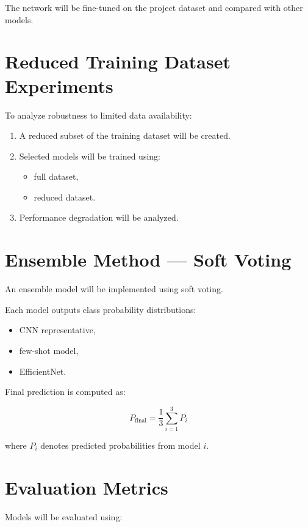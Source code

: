 \documentclass[11pt,a4paper]{article}
\begin{document}
The network will be fine-tuned on the project dataset and compared with other models.

\section{Reduced Training Dataset Experiments}

To analyze robustness to limited data availability:

\begin{enumerate}
    \item A reduced subset of the training dataset will be created.
    \item Selected models will be trained using:
    \begin{itemize}
        \item full dataset,
        \item reduced dataset.
    \end{itemize}
    \item Performance degradation will be analyzed.
\end{enumerate}

\section{Ensemble Method --- Soft Voting}

An ensemble model will be implemented using soft voting.

Each model outputs class probability distributions:

\begin{itemize}
    \item CNN representative,
    \item few-shot model,
    \item EfficientNet.
\end{itemize}

Final prediction is computed as:

\begin{equation}
P_{\text{final}} = \frac{1}{3}\sum_{i=1}^{3} P_i
\end{equation}

where $P_i$ denotes predicted probabilities from model $i$.

\section{Evaluation Metrics}

Models will be evaluated using:
\end{document}

